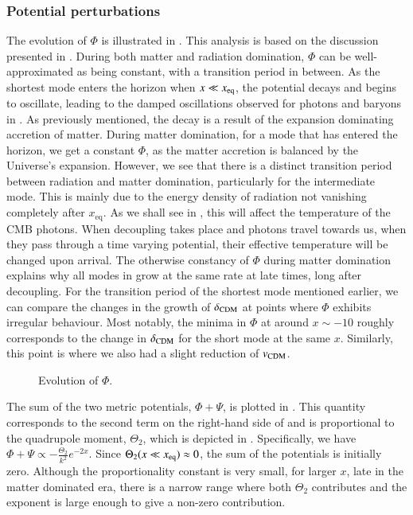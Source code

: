 \subsubsection{Potential perturbations} \label{sssec:M3:results:potential_perturbations}
The evolution of $\Phi$ is illustrated in . This analysis is based on the discussion presented in \cite[Ch. 8]{Dodelson}. During both matter and radiation domination, $\Phi$ can be well-approximated as being constant, with a transition period in between. As the shortest mode enters the horizon when $x\ll x_\mathrm{eq}$, the potential decays and begins to oscillate, leading to the damped oscillations observed for photons and baryons in . As previously mentioned, the decay is a result of the expansion dominating accretion of matter. During matter domination, for a mode that has entered the horizon, we get a constant $\Phi$, as the matter accretion is balanced by the Universe's expansion. However, we see that there is a distinct transition period between radiation and matter domination, particularly for the intermediate mode. This is mainly due to the energy density of radiation not vanishing completely after $x_\mathrm{eq}$. As we shall see in , this will affect the temperature of the CMB photons. When decoupling takes place and photons travel towards us, when they pass through a time varying potential, their effective temperature will be changed upon arrival. The otherwise constancy of $\Phi$ during matter domination explains why all modes in  grow at the same rate at late times, long after decoupling. For the transition period of the shortest mode mentioned earlier, we can compare the changes in the growth of $\delta_\mathrm{CDM}$ at points where $\Phi$ exhibits irregular behaviour. Most notably, the minima in $\Phi$ at around $x\sim-10$ roughly corresponds to the change in $\delta_\mathrm{CDM}$ for the short mode at the same $x$. Similarly, this point is where we also had a slight reduction of $v_\mathrm{CDM}$. 

\begin{figure}[ht!]
    \caption{Evolution of $\Phi$.}
    \label{fig:M3:results:Phi}
\end{figure}

The sum of the two metric potentials, $\Phi+\Psi$, is plotted in . This quantity corresponds to the second term on the right-hand side of  and is proportional to the quadrupole moment, $\Theta_2$, which is depicted in . Specifically, we have $\Phi+\Psi \propto -\frac{\Theta_2}{k^2} e^{-2x}$. Since $\Theta_2(x\ll x_\mathrm{eq})\approx 0$, the sum of the potentials is initially zero. Although the proportionality constant is very small, for larger $x$, late in the matter dominated era, there is a narrow range where both $\Theta_2$ contributes and the exponent is large enough to give a non-zero contribution.

